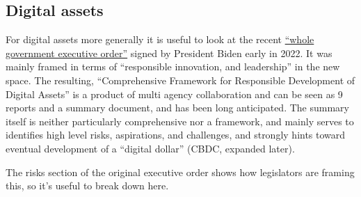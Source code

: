 \subsection{Digital assets}
For digital assets more generally it is useful to look at the recent \href{https://www.whitehouse.gov/briefing-room/presidential-actions/2022/03/09/executive-order-on-ensuring-responsible-development-of-digital-assets/}{``whole government executive order''} signed by President Biden early in 2022. It was mainly framed in terms of ``responsible innovation, and leadership'' in the new space. The resulting, ``Comprehensive Framework for Responsible Development of Digital Assets'' is a product of multi agency collaboration and can be seen as 9 reports and a summary document, and has been long anticipated. The summary itself is neither particularly comprehensive nor a framework, and mainly serves to identifies high level risks, aspirations, and challenges, and strongly hints toward eventual development of a ``digital dollar'' (CBDC, expanded later). \par
The risks section of the original executive order shows how legislators are framing this, so it's useful to break down here.\par
